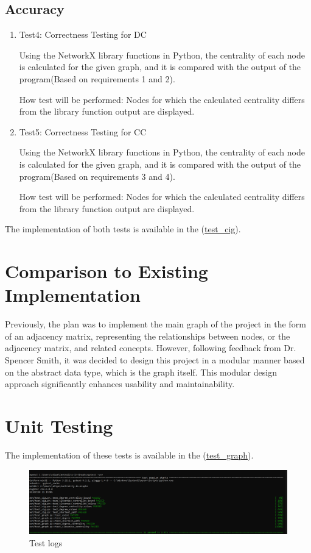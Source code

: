 \documentclass[12pt, titlepage]{article}
\begin{document}
\subsection{Accuracy}
\begin{enumerate}
\item{Test4: Correctness Testing for DC\\}

 Using the NetworkX library functions in Python, the centrality of each node is calculated for the given graph, and it is compared with the output of the program(Based on requirements 1 and 2).

How test will be performed: Nodes for which the calculated centrality differs from the library function output are displayed.

\item{Test5: Correctness Testing for CC\\}

Using the NetworkX library functions in Python, the centrality of each node is calculated for the given graph, and it is compared with the output of the program(Based on requirements 3 and 4).

How test will be performed: Nodes for which the calculated centrality differs from the library function output are displayed.

\end{enumerate}
The implementation of both tests is available in the  (\href{https://github.com/AtiyehSayadi/Centrality-In-Graphs/blob/main/test/test\_cig.py}{test\_cig}).
\section{Comparison to Existing Implementation}	
Previously, the plan was to implement the main graph of the project in the form of an adjacency matrix, representing the relationships between nodes, or the adjacency matrix, and related concepts. However, following feedback from Dr. Spencer Smith, it was decided to design this project in a modular manner based on the abstract data type, which is the graph itself. This modular design approach significantly enhances usability and maintainability.

\section{Unit Testing}
The implementation of these tests is available in the  (\href{https://github.com/AtiyehSayadi/Centrality-In-Graphs/blob/main/test/test\_graph.py}{test\_graph}).
\begin{figure}[h!]
    \centering
   \includegraphics[width=1.0\textwidth, keepaspectratio]{repo.png}
    \caption{Test logs}
\end{figure}
\end{document}

